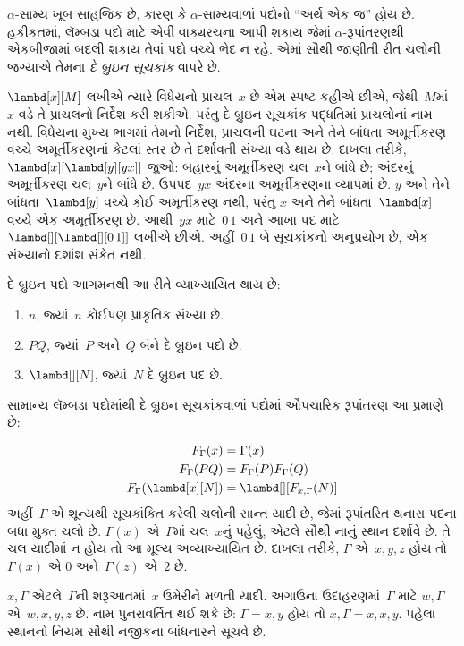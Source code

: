 \documentclass[../../../include/open-logic-section]{subfiles}
\begin{document}


$\alpha$-સામ્ય ખૂબ સાહજિક છે, કારણ કે $\alpha$-સામ્યવાળાં
પદોનો ``અર્થ એક જ'' હોય છે. હકીકતમાં, લૅમ્બડા પદો માટે એવી
વાક્યરચના આપી શકાય જેમાં $\alpha$-રૂપાંતરણથી એકબીજામાં
બદલી શકાય તેવાં પદો વચ્ચે ભેદ ન રહે. એમાં સૌથી જાણીતી
રીત ચલોની જગ્યાએ તેમના \emph{દે બ્રુઇન સૂચકાંક} વાપરે છે.

$\lambd[x][M]$ લખીએ ત્યારે વિધેયનો પ્રાચલ~$x$ છે એમ
સ્પષ્ટ કહીએ છીએ, જેથી~$M$માં~$x$ વડે તે પ્રાચલનો નિર્દેશ
કરી શકીએ. પરંતુ દે બ્રુઇન સૂચકાંક પદ્ધતિમાં પ્રાચલોનાં નામ
નથી. વિધેયના મુખ્ય ભાગમાં તેમનો નિર્દેશ, પ્રાચલની ઘટના અને
તેને બાંધતા અમૂર્તીકરણ વચ્ચે અમૂર્તીકરણનાં કેટલાં સ્તર છે
તે દર્શાવતી સંખ્યા વડે થાય છે. દાખલા તરીકે,
$\lambd[x][\lambd[y][y x]]$ જુઓ: બહારનું અમૂર્તીકરણ
ચલ~$x$ને બાંધે છે; અંદરનું અમૂર્તીકરણ ચલ~$y$ને બાંધે છે.
ઉપપદ~$y x$ અંદરના અમૂર્તીકરણના વ્યાપમાં છે. $y$ અને
તેને બાંધતા~$\lambd[y]$ વચ્ચે કોઈ અમૂર્તીકરણ નથી, પરંતુ
$x$ અને તેને બાંધતા~$\lambd[x]$ વચ્ચે એક અમૂર્તીકરણ છે.
આથી~$y x$ માટે~$0\, 1$ અને આખા પદ માટે
$\lambd[][\lambd[][0\,1]]$ લખીએ છીએ. અહીં~$0\,1$ બે
સૂચકાંકનો અનુપ્રયોગ છે, એક સંખ્યાનો દશાંશ સંકેત નથી.

\begin{defn}
  દે બ્રુઇન પદો આગમનથી આ રીતે વ્યાખ્યાયિત થાય છે:
  \begin{enumerate}
  \item $n$, જ્યાં~$n$ કોઈપણ પ્રાકૃતિક સંખ્યા છે.
  \item $PQ$, જ્યાં~$P$ અને~$Q$ બંને દે બ્રુઇન પદો છે.
  \item $\lambd[][N]$, જ્યાં~$N$ દે બ્રુઇન પદ છે.
  \end{enumerate}
\end{defn}

સામાન્ય લૅમ્બડા પદોમાંથી દે બ્રુઇન સૂચકાંકવાળાં પદોમાં
ઔપચારિક રૂપાંતરણ આ પ્રમાણે છે:
\begin{defn}
  \begin{align*}
    F_\Gamma(x) &= \Gamma(x) \\
    F_\Gamma(PQ) &= F_\Gamma(P)F_\Gamma(Q) \\
    F_\Gamma(\lambd[x][N]) &= \lambd[][F_{x,\Gamma}(N)]
  \end{align*}
  અહીં~$\Gamma$ એ શૂન્યથી સૂચકાંકિત કરેલી ચલોની સાન્ત યાદી છે,
  જેમાં રૂપાંતરિત થનારા પદના બધા મુક્ત ચલો છે.
  $\Gamma(x)$ એ~$\Gamma$માં ચલ~$x$નું પહેલું, એટલે સૌથી નાનું
  સ્થાન દર્શાવે છે. તે ચલ યાદીમાં ન હોય તો આ મૂલ્ય અવ્યાખ્યાયિત છે.
  દાખલા તરીકે, $\Gamma$ એ~$x,y,z$ હોય તો~$\Gamma(x)$ એ
  $0$ અને~$\Gamma(z)$ એ~$2$ છે.

  $x,\Gamma$ એટલે~$\Gamma$ની શરૂઆતમાં~$x$ ઉમેરીને મળતી
  યાદી. અગાઉના ઉદાહરણમાં~$\Gamma$ માટે
  $w,\Gamma$ એ~$w,x,y,z$ છે.
  નામ પુનરાવર્તિત થઈ શકે છે: $\Gamma=x,y$ હોય તો
  $x,\Gamma=x,x,y$. પહેલા સ્થાનનો નિયમ સૌથી નજીકના
  બાંધનારને સૂચવે છે.
\end{defn}
\end{document}
